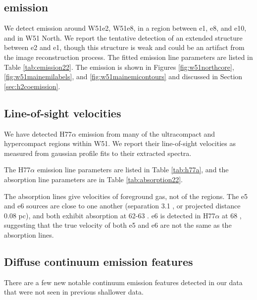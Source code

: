 \subsection{\formaldehyde \twotwo emission}
\label{sec:twotwoemission}
We detect \formaldehyde \twotwo emission around W51e2, W51e8, in a region
between e1, e8, and e10, and in W51 North.  We report the tentative detection
of an extended structure between e2 and e1, though this structure is weak
and could be an artifact from the image reconstruction process.  The fitted
emission line parameters are listed in Table \ref{tab:emission22}.  The
emission is shown in Figures \ref{fig:w51northcore},
\ref{fig:w51mainemilabels}, and \ref{fig:w51mainemicontours} and discussed in
Section \ref{sec:h2coemission}.



\subsection{Line-of-sight velocities}
\label{sec:LOSvelo}
We have detected H77$\alpha$ emission from many of the ultracompact and
hypercompact \hii regions within W51.  We report their line-of-sight velocities
as measured from gaussian profile fits to their extracted spectra.

The H77$\alpha$ emission line parameters are listed in Table \ref{tab:h77a}, and
the \para \twotwo absorption line parameters are in Table \ref{tab:absorption22}.

The \formaldehyde absorption lines give velocities of foreground gas, not of
the \hii regions.  The e5 and e6 sources are close to one another (separation
3.1 \arcsec, or projected distance 0.08 pc), and both exhibit \formaldehyde
absorption at 62-63 \kms.  e6 is detected in H77$\alpha$ at 68 \kms, suggesting
that the true velocity of both e5 and e6 are not the same as the \formaldehyde
absorption lines. 






\subsection{Diffuse continuum emission features}
\label{sec:diffuseemission}
There are a few new notable continuum emission features detected in our data
that were not seen in previous shallower data.

